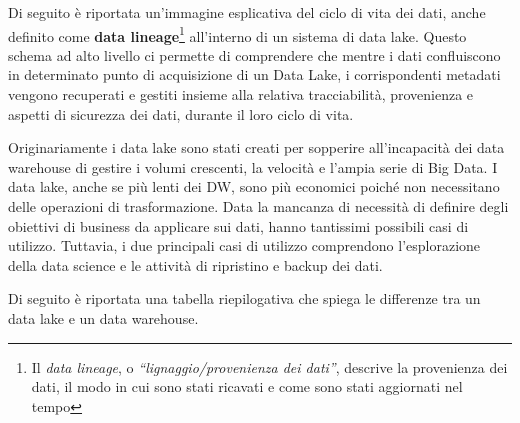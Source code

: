 Di seguito è riportata un’immagine esplicativa del ciclo di vita dei dati, anche definito come \textbf{data lineage}\footnote{Il \textit{data lineage}, o \textit{“lignaggio/provenienza dei dati”}, descrive la provenienza dei dati, il modo in cui sono stati ricavati e come sono stati aggiornati nel tempo} all'interno di un sistema di data lake. Questo schema ad alto livello ci permette di comprendere che mentre i dati confluiscono in determinato punto di acquisizione di un Data Lake, i corrispondenti metadati vengono recuperati e gestiti insieme alla relativa tracciabilità, provenienza e aspetti di sicurezza dei dati, durante il loro ciclo di vita.\cite{data_lake_for_enterprices}

Originariamente i data lake sono stati creati per sopperire all’incapacità dei data warehouse di gestire i volumi crescenti, la velocità e l’ampia serie di Big Data. I data lake, anche se più lenti dei DW, sono più economici poiché non necessitano delle operazioni di trasformazione. Data la mancanza di necessità di definire degli obiettivi di business da applicare sui dati, hanno tantissimi possibili casi di utilizzo. Tuttavia, i due principali casi di utilizzo comprendono l’esplorazione della data science e le attività di ripristino e backup dei dati.\cite{ibm_data_architecture}

Di seguito è riportata una tabella riepilogativa che spiega le differenze tra un data lake e un data warehouse.\cite{aws_data_lake_vs_data_warehouse}

